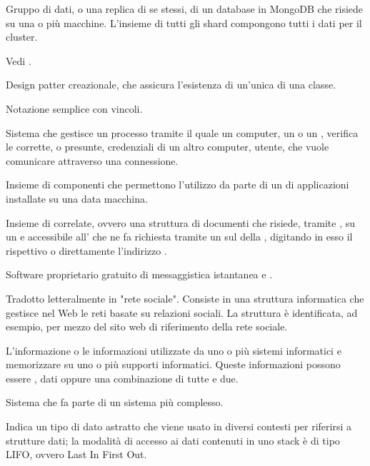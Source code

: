 {Gruppo di dati, o una replica di se stessi, di un database in MongoDB che risiede su una o più macchine. L'insieme di tutti gli shard compongono tutti i dati per il cluster.}

{Vedi .}

{Design patter creazionale, che assicura l'esistenza di un'unica di una classe.}

{Notazione semplice con vincoli.}

{Sistema che gestisce un processo tramite il quale un computer, un  o un , verifica le corrette, o presunte, credenziali di un altro computer, utente, che vuole comunicare attraverso una connessione.}

{Insieme di componenti  che permettono l'utilizzo da parte di un  di applicazioni installate su una data macchina.}

{Insieme di  correlate, ovvero una struttura  di documenti che risiede, tramite , su un   e accessibile all'  che ne fa richiesta tramite un  sul  della  , digitando in esso il rispettivo  o direttamente l'indirizzo .}

{Software proprietario gratuito di messaggistica istantanea e .}

{Tradotto letteralmente in "rete sociale". Consiste in una struttura informatica che gestisce nel Web le reti basate su relazioni sociali. La struttura è identificata, ad esempio, per mezzo del sito web di riferimento della rete sociale.}

{L'informazione o le informazioni utilizzate da uno o più sistemi informatici e memorizzare su uno o più supporti informatici. Queste informazioni possono essere , dati oppure una combinazione di tutte e due.}

{Sistema che fa parte di un sistema più complesso.}

{Indica un tipo di dato astratto che viene usato in diversi contesti per riferirsi a strutture dati; la modalità di accesso ai dati contenuti in uno stack è di tipo LIFO, ovvero Last In First Out.}

